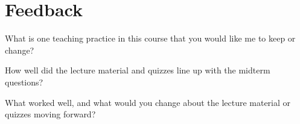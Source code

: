\documentclass[aspectratio=169, 14pt, t]{beamer}  %
\begin{document}
\section{Feedback}

\begin{poll}[c]
  \large What is one teaching practice in this course that you would like me to keep or change?
\end{poll}

\begin{poll}[c]
  \large How well did the lecture material and quizzes line up with the midterm questions?

  What worked well, and what would you change about the lecture material or quizzes moving forward?
\end{poll}
\end{document}
